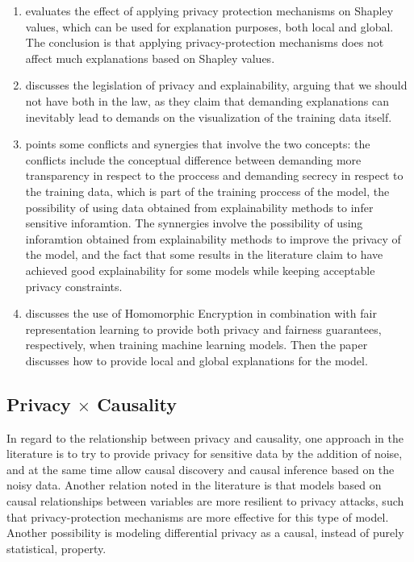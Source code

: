 \begin{enumerate}
\item \cite{bozorgpanah2022privacy} evaluates the effect of applying privacy protection mechanisms on Shapley values, which can be used for explanation purposes, both local and global. The conclusion is that applying privacy-protection mechanisms does not affect much explanations based on Shapley values.
\item \cite{grant2020show} discusses the legislation of privacy and explainability, arguing that we should not have both in the law, as they claim that demanding explanations can inevitably lead to demands on the visualization of the training data itself.
\item \cite{Sok} points some conflicts and synergies that involve the two concepts: the conflicts include the conceptual difference between demanding more transparency in respect to the proccess and demanding secrecy in respect to the training data, which is part of the training proccess of the model, the possibility of using data obtained from explainability methods to infer sensitive inforamtion. The synnergies involve the possibility of using inforamtion obtained from explainability methods to improve the privacy of the model, and the fact that some results in the literature claim to have achieved good explainability for some models while keeping acceptable privacy constraints.
\item \cite{franco2021toward} discusses the use of Homomorphic Encryption in combination with fair representation learning \cite{zemel2013learning} to provide both privacy and fairness guarantees, respectively, when training machine learning models. Then the paper discusses how to provide local and global explanations for the model.
\end{enumerate}


\subsection{Privacy $\times$ Causality}

In regard to the relationship between privacy and causality, one approach in the literature is to try to provide privacy for sensitive data by the addition of noise, and at the same time allow causal discovery and causal inference based on the noisy data. Another relation noted in the literature is that models based on causal relationships between variables are more resilient to privacy attacks, such that privacy-protection mechanisms are more effective for this type of model. Another possibility is modeling differential privacy as a causal, instead of purely statistical, property. 

